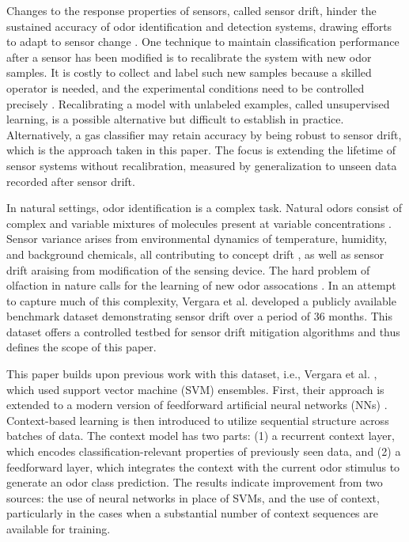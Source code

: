 \documentclass[onecolumn,pre,floats,aps,amsmath,amssymb,superscriptaddress]{revtex4-1}
\begin{document}
Changes to the response properties of sensors, called sensor drift, hinder the sustained accuracy of odor identification and detection systems, drawing efforts to adapt to sensor change \cite{marco_signal_2012}. One technique to maintain classification performance after a sensor has been modified is to recalibrate the system with new odor samples. It is costly to collect and label such new samples because a skilled operator is needed, and the experimental conditions need to be controlled precisely \cite{marco_signal_2012}. Recalibrating a model with unlabeled examples, called unsupervised learning, is a possible alternative but difficult to establish in practice. Alternatively, a gas classifier may retain accuracy by being robust to sensor drift, which is the approach taken in this paper. The focus is extending the lifetime of sensor systems without recalibration, measured by generalization to unseen data recorded after sensor drift.

In natural settings, odor identification is a complex task. Natural odors consist of complex and variable mixtures of molecules present at variable concentrations \cite{thomas-danguin_perception_2014}. Sensor variance arises from environmental dynamics of temperature, humidity, and background chemicals, all contributing to concept drift \cite{vito_pattern_2016}, as well as sensor drift araising from modification of the sensing device. The hard problem of olfaction in nature calls for the learning of new odor assocations \cite{imam_rapid_2019}. In an attempt to capture much of this complexity, Vergara et al. \cite{vergara_chemical_2012} developed a publicly available benchmark dataset demonstrating sensor drift over a period of 36 months. This dataset offers a controlled testbed for sensor drift mitigation algorithms and thus defines the scope of this paper. 

This paper builds upon previous work with this dataset, i.e., Vergara et al. \cite{vergara_chemical_2012}, which used support vector machine (SVM) ensembles. First, their approach is extended to a modern version of feedforward artificial neural networks (NNs) \cite{pardo_remarks_2004}. Context-based learning is then introduced to utilize sequential structure across batches of data. The context model has two parts: (1) a recurrent context layer, which encodes classification-relevant properties of previously seen data, and (2) a feedforward layer, which integrates the context with the current odor stimulus to generate an odor class prediction. The results indicate improvement from two sources: the use of neural networks in place of SVMs, and the use of context, particularly in the cases when a substantial number of context sequences are available for training.
\end{document}
